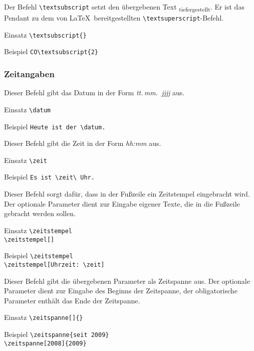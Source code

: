 \DescribeMacro{\textsubscript}
Der Befehl \verb#\textsubscript# setzt den übergebenen Text \textsubscript{tiefergestellt}.
Er ist das Pendant zu dem von \LaTeX\ bereitgestellten \verb#\textsuperscript#-Befehl.
\begin{einspiel}{Einsatz}
 \>\verb#\textsubscript{#\verb#}#
\end{einspiel}
\begin{einspiel}{Beispiel}
 \>\verb#CO\textsubscript{2}#
\end{einspiel}

\subsubsection{Zeitangaben}
\label{sec:New:Zeitangaben}

\DescribeMacro{\datum}
Dieser Befehl gibt das Datum in der Form \emph{tt.\,mm.\ jjjj} aus.
\begin{einspiel}{Einsatz}
 \>\verb#\datum#
\end{einspiel}
\begin{einspiel}{Beispiel}
 \>\verb#Heute ist der \datum.#
\end{einspiel}

\DescribeMacro{\zeit}
Dieser Befehl gibt die Zeit in der Form \emph{hh:mm} aus.
\begin{einspiel}{Einsatz}
 \>\verb#\zeit#
\end{einspiel}
\begin{einspiel}{Beispiel}
 \>\verb#Es ist \zeit\ Uhr.#
\end{einspiel}

\DescribeMacro{\zeitstempel}
Dieser Befehl sorgt dafür, dass in der Fußzeile ein Zeitstempel eingebracht
wird.
Der optionale Parameter dient zur Eingabe eigener Texte, die
in die Fußzeile gebracht werden sollen.
\begin{einspiel}{Einsatz}
 \>\verb#\zeitstempel#\\
 \>\verb#\zeitstempel[#\verb#]#
\end{einspiel}
\begin{einspiel}{Beispiel}
 \>\verb#\zeitstempel#\\
 \>\verb#\zeitstempel[Uhrzeit: \zeit]#\\
\end{einspiel}

\DescribeMacro{\zeitspanne}
Dieser Befehl gibt die übergebenen Parameter als Zeitspanne aus.
Der optionale Parameter dient zur Eingabe des Beginns der Zeitspanne, der obligatorische Parameter enthält das Ende der Zeitspanne.
\begin{einspiel}{Einsatz}
 \>\verb#\zeitspanne[#\verb#]{#\verb#}#
\end{einspiel}
\begin{einspiel}{Beispiel}
 \>\verb#\zeitspanne{seit 2009}#\\
 \>\verb#\zeitspanne[2008]{2009}#\\
\end{einspiel}

